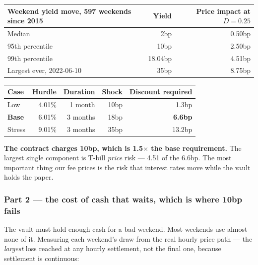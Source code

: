\documentclass[11pt,a4paper]{article}
\begin{document}
\begin{center}
\small
\begin{tabular}{@{}lrr@{}}
\toprule
\textbf{Weekend yield move, 597 weekends since 2015} & \textbf{Yield} & \textbf{Price impact at $D=0.25$} \\
\midrule
Median & 2bp & 0.50bp \\
95th percentile & 10bp & 2.50bp \\
99th percentile & 18.04bp & 4.51bp \\
Largest ever, 2022-06-10 & 35bp & 8.75bp \\
\bottomrule
\end{tabular}
\end{center}

\begin{center}
\small
\begin{tabular}{@{}lrrrr@{}}
\toprule
\textbf{Case} & \textbf{Hurdle} & \textbf{Duration} & \textbf{Shock} & \textbf{Discount required} \\
\midrule
Low & 4.01\% & 1 month & 10bp & 1.3bp \\
\textbf{Base} & 6.01\% & 3 months & 18bp & \textbf{6.6bp} \\
Stress & 9.01\% & 3 months & 35bp & 13.2bp \\
\bottomrule
\end{tabular}
\end{center}

\textbf{The contract charges 10bp, which is 1.5$\times$ the base requirement.} The largest single
component is T-bill \emph{price} risk — 4.51 of the 6.6bp. The most important thing our fee prices is
the risk that interest rates move while the vault holds the paper.

\subsubsection*{Part 2 --- the cost of cash that waits, which is where 10bp fails}

The vault must hold enough cash for a bad weekend. Most weekends use almost none of it. Measuring
each weekend's draw from the real hourly price path — the \emph{largest} loss reached at any hourly
settlement, not the final one, because settlement is continuous:
\end{document}
